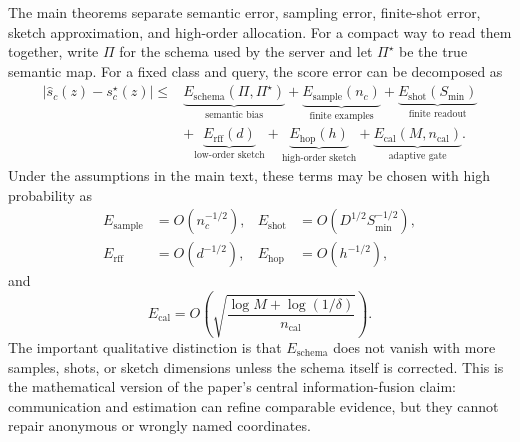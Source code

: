 The main theorems separate semantic error, sampling error, finite-shot error, sketch approximation, and high-order allocation. For a compact way to read them together, write \(\Pi\) for the schema used by the server and let \(\Pi^\star\) be the true semantic map. For a fixed class and query, the score error can be decomposed as
\begin{equation}
\begin{aligned}
|\hat s_c(z)-s_c^\star(z)|
\le&
\underbrace{E_{\mathrm{schema}}(\Pi,\Pi^\star)}_{\text{semantic bias}}
+\underbrace{E_{\mathrm{sample}}(n_c)}_{\text{finite examples}}
+\underbrace{E_{\mathrm{shot}}(S_{\min})}_{\text{finite readout}}\\
&+\underbrace{E_{\mathrm{rff}}(d)}_{\text{low-order sketch}}
+\underbrace{E_{\mathrm{hop}}(h)}_{\text{high-order sketch}}
+\underbrace{E_{\mathrm{cal}}(M,n_{\mathrm{cal}})}_{\text{adaptive gate}} .
\end{aligned}
\end{equation}
Under the assumptions in the main text, these terms may be chosen with high probability as
\begin{equation}
\begin{aligned}
    E_{\mathrm{sample}}&=O(n_c^{-1/2}),&
    E_{\mathrm{shot}}&=O(D^{1/2}S_{\min}^{-1/2}),\\
    E_{\mathrm{rff}}&=O(d^{-1/2}),&
    E_{\mathrm{hop}}&=O(h^{-1/2}),
\end{aligned}
\end{equation}
and
\begin{equation}
    E_{\mathrm{cal}}=
    O\!\left(\sqrt{\frac{\log M+\log(1/\delta)}{n_{\mathrm{cal}}}}\right).
\end{equation}
The important qualitative distinction is that \(E_{\mathrm{schema}}\) does not vanish with more samples, shots, or sketch dimensions unless the schema itself is corrected. This is the mathematical version of the paper's central information-fusion claim: communication and estimation can refine comparable evidence, but they cannot repair anonymous or wrongly named coordinates.
